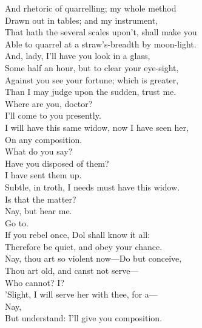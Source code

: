 \documentclass[a4paper,oneside]{memoir}
\begin{document}
\begin{drama*}
And rhetoric of quarrelling; my whole method\\
Drawn out in tables; and my instrument,\\
That hath the several scales upon't, shall make you\\
Able to quarrel at a straw's-breadth by moon-light.\\
And, lady, I'll have you look in a glass,\\
Some half an hour, but to clear your eye-sight,\\
Against you see your fortune; which is greater,\\
Than I may judge upon the sudden, trust me.\\
\facespeaks Where are you, doctor?\\
\subtlespeaks {} I'll come to you presently.\\
\facespeaks {} I will have this same widow, now I have seen her,\\
On any composition.\\
\subtlespeaks {} What do you say?\\
\facespeaks Have you disposed of them?\\
\subtlespeaks {} I have sent them up.\\
\facespeaks Subtle, in troth, I needs must have this widow.\\
\subtlespeaks Is that the matter?\\
\facespeaks {} Nay, but hear me.\\
\subtlespeaks {} Go to.\\
If you rebel once, Dol shall know it all:\\
Therefore be quiet, and obey your chance.\\
\facespeaks Nay, thou art so violent now---Do but conceive,\\
Thou art old, and canst not serve---\\
\subtlespeaks {} Who cannot? I?\\
'Slight, I will serve her with thee, for a---\\
\facespeaks {} Nay,\\
But understand: I'll give you composition.\\

\end{drama*}
\end{document}
